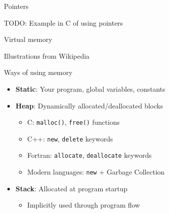 \documentclass[sans,mathserif]{beamer}
\begin{document}
\begin{frame}{Pointers}

TODO: Example in C of using pointers
  
\end{frame}

\begin{frame}{Virtual memory}
{\tiny Illustrations from Wikipedia}
\end{frame}


\begin{frame}{Ways of using memory}

  \begin{itemize}
  \item<+-> {\bf Static}: Your program, global variables, constants
  \item<+-> {\bf Heap}: Dynamically allocated/deallocated blocks
    \begin{itemize}
    \item C: {\tt malloc()}, {\tt free()} functions
    \item C++: {\tt new}, {\tt delete} keywords
    \item Fortran: {\tt allocate}, {\tt deallocate} keywords
    \item Modern languages: {\tt new} + Garbage Collection
    \end{itemize}
  \item<+-> {\bf Stack}: Allocated at program startup
    \begin{itemize}
    \item Implicitly used through program flow
    \end{itemize}
  \end{itemize}

~


\end{frame}
\end{document}
